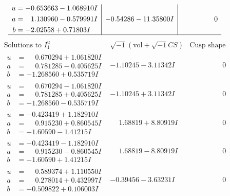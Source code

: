 \documentclass[1p]{elsarticle_modified}
\theoremstyle{definition}
\newcommand{\I}{\sqrt{-1}}
\begin{document}
$$\begin{array}{c|c|c}
\begin{aligned}
u &= -0.653663 - 1.068910 I \\
a &= \phantom{-}1.130960 - 0.579991 I \\
b &= -2.02558 + 0.71803 I\end{aligned}
 & -0.54286 - 11.35800 I & \phantom{-0.000000 } 0\\
 \hline 
 \end{array}$$\newpage$$\begin{array}{c|c|c}  
\text{Solutions to }I^u_{1}& \I (\text{vol} + \sqrt{-1}CS) & \text{Cusp shape}\\
 \hline 
\begin{aligned}
u &= \phantom{-}0.670294 + 1.061820 I \\
a &= \phantom{-}0.781285 - 0.405625 I \\
b &= -1.268560 + 0.535719 I\end{aligned}
 & -1.10245 - 3.11342 I & \phantom{-0.000000 } 0 \\ \hline\begin{aligned}
u &= \phantom{-}0.670294 - 1.061820 I \\
a &= \phantom{-}0.781285 + 0.405625 I \\
b &= -1.268560 - 0.535719 I\end{aligned}
 & -1.10245 + 3.11342 I & \phantom{-0.000000 } 0 \\ \hline\begin{aligned}
u &= -0.423419 + 1.182910 I \\
a &= \phantom{-}0.915230 + 0.860545 I \\
b &= -1.60590 - 1.41215 I\end{aligned}
 & \phantom{-}1.68819 + 8.80919 I & \phantom{-0.000000 } 0 \\ \hline\begin{aligned}
u &= -0.423419 - 1.182910 I \\
a &= \phantom{-}0.915230 - 0.860545 I \\
b &= -1.60590 + 1.41215 I\end{aligned}
 & \phantom{-}1.68819 - 8.80919 I & \phantom{-0.000000 } 0 \\ \hline\begin{aligned}
u &= \phantom{-}0.589374 + 1.110550 I \\
a &= \phantom{-}0.278014 + 0.432997 I \\
b &= -0.509822 + 0.106003 I\end{aligned}
 & -0.39456 - 3.63231 I & \phantom{-0.000000 } 0 \\ \hline\begin{aligned}

\end{aligned}
\end{array}$$
\end{document}
